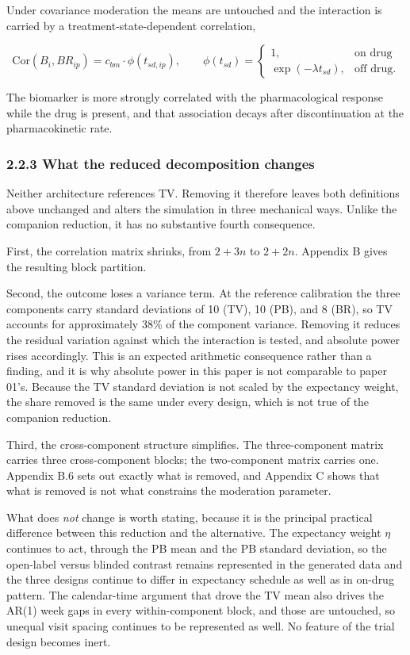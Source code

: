 \documentclass[
  11pt,
]{article}
\begin{document}
Under covariance moderation the means are untouched and the
interaction is carried by a treatment-state-dependent correlation,

\[
\mathrm{Cor}(B_i, BR_{ip}) = c_{bm} \cdot \phi(t_{sd,ip}), \qquad
\phi(t_{sd}) = \begin{cases}
1, & \text{on drug} \\
\exp(-\lambda t_{sd}), & \text{off drug.}
\end{cases}
\]

The biomarker is more strongly correlated with the pharmacological
response while the drug is present, and that association decays after
discontinuation at the pharmacokinetic rate.

\subsubsection{2.2.3 What the reduced decomposition changes}

Neither architecture references TV. Removing it therefore leaves both
definitions above unchanged and alters the simulation in three
mechanical ways. Unlike the companion reduction, it has no
substantive fourth consequence.

First, the correlation matrix shrinks, from \(2 + 3n\) to \(2 + 2n\).
Appendix B gives the resulting block partition.

Second, the outcome loses a variance term. At the reference
calibration the three components carry standard deviations of 10
(TV), 10 (PB), and 8 (BR), so TV accounts for approximately 38\% of
the component variance. Removing it reduces the residual variation
against which the interaction is tested, and absolute power rises
accordingly. This is an expected arithmetic consequence rather than a
finding, and it is why absolute power in this paper is not comparable
to paper 01's. Because the TV standard deviation is not scaled by the
expectancy weight, the share removed is the same under every design,
which is not true of the companion reduction.

Third, the cross-component structure simplifies. The three-component
matrix carries three cross-component blocks; the two-component matrix
carries one. Appendix B.6 sets out exactly what is removed, and
Appendix C shows that what is removed is not what constrains the
moderation parameter.

What does \emph{not} change is worth stating, because it is the
principal practical difference between this reduction and the
alternative. The expectancy weight \(\eta\) continues to act, through
the PB mean and the PB standard deviation, so the open-label versus
blinded contrast remains represented in the generated data and the
three designs continue to differ in expectancy schedule as well as in
on-drug pattern. The calendar-time argument that drove the TV mean
also drives the AR(1) week gaps in every within-component block, and
those are untouched, so unequal visit spacing continues to be
represented as well. No feature of the trial design becomes inert.
\end{document}

